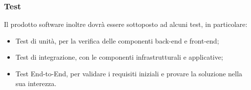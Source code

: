 \subsubsection{Test}
Il prodotto software inoltre dovrà essere sottoposto ad alcuni test, in particolare:
\begin{itemize}
    \item Test di unità, per la verifica delle componenti back-end e front-end;
    \item Test di integrazione, con le componenti infrastrutturali e applicative;
    \item Test End-to-End, per validare i requisiti iniziali e provare la soluzione nella sua interezza.
\end{itemize}
